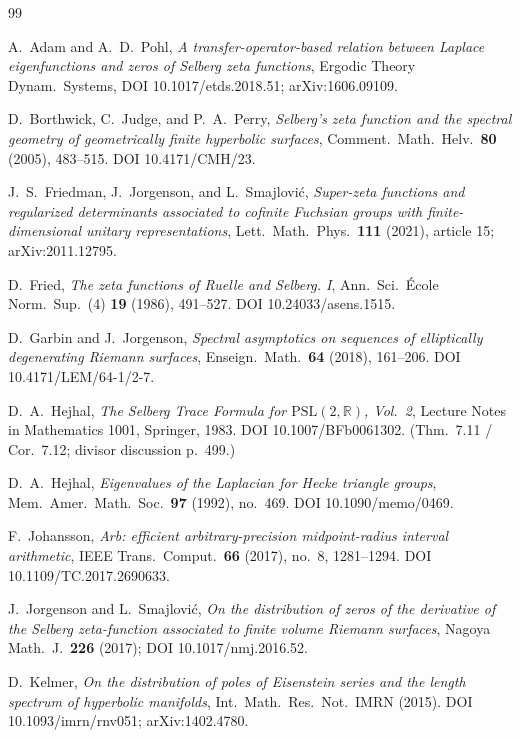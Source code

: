 \documentclass[11pt]{amsart}
\theoremstyle{definition}
\theoremstyle{remark}
\begin{document}
\begin{thebibliography}{99}

A.~Adam and A.~D.~Pohl,
\emph{A transfer-operator-based relation between Laplace
eigenfunctions and zeros of Selberg zeta functions},
Ergodic Theory Dynam.\ Systems,
DOI 10.1017/etds.2018.51;
arXiv:1606.09109.

D.~Borthwick, C.~Judge, and P.~A.~Perry,
\emph{Selberg's zeta function and the spectral geometry of
geometrically finite hyperbolic surfaces},
Comment.\ Math.\ Helv.\ \textbf{80} (2005), 483--515.
DOI 10.4171/CMH/23.

J.~S.~Friedman, J.~Jorgenson, and L.~Smajlovi\'c,
\emph{Super-zeta functions and regularized determinants associated
to cofinite Fuchsian groups with finite-dimensional unitary
representations},
Lett.\ Math.\ Phys.\ \textbf{111} (2021), article 15;
arXiv:2011.12795.

D.~Fried,
\emph{The zeta functions of Ruelle and Selberg. I},
Ann.\ Sci.\ \'Ecole Norm.\ Sup.\ (4) \textbf{19} (1986), 491--527.
DOI 10.24033/asens.1515.

D.~Garbin and J.~Jorgenson,
\emph{Spectral asymptotics on sequences of elliptically degenerating
Riemann surfaces},
Enseign.\ Math.\ \textbf{64} (2018), 161--206.
DOI 10.4171/LEM/64-1/2-7.

D.~A.~Hejhal,
\emph{The Selberg Trace Formula for $\mathrm{PSL}(2,\mathbb R)$,
Vol.\ 2},
Lecture Notes in Mathematics 1001, Springer, 1983.
DOI 10.1007/BFb0061302.
(Thm.\ 7.11 / Cor.\ 7.12; divisor discussion p.~499.)

D.~A.~Hejhal,
\emph{Eigenvalues of the Laplacian for Hecke triangle groups},
Mem.\ Amer.\ Math.\ Soc.\ \textbf{97} (1992), no.~469.
DOI 10.1090/memo/0469.

F.~Johansson,
\emph{Arb: efficient arbitrary-precision midpoint-radius interval
arithmetic},
IEEE Trans.\ Comput.\ \textbf{66} (2017), no.~8, 1281--1294.
DOI 10.1109/TC.2017.2690633.

J.~Jorgenson and L.~Smajlovi\'c,
\emph{On the distribution of zeros of the derivative of the Selberg
zeta-function associated to finite volume Riemann surfaces},
Nagoya Math.\ J.\ \textbf{226} (2017);
DOI 10.1017/nmj.2016.52.

D.~Kelmer,
\emph{On the distribution of poles of Eisenstein series and the
length spectrum of hyperbolic manifolds},
Int.\ Math.\ Res.\ Not.\ IMRN (2015).
DOI 10.1093/imrn/rnv051;
arXiv:1402.4780.


\end{thebibliography}
\end{document}
